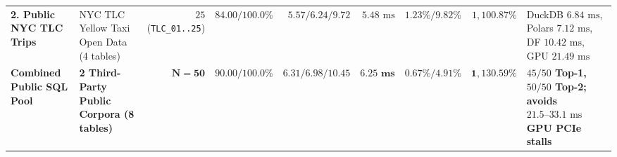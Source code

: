 \documentclass[10pt,a4paper]{article}
\begin{document}
\begin{table}[htbp]
\begin{tabular}{@{}llrrrrrrl@{}}
\textbf{2. Public NYC TLC Trips} & NYC TLC Yellow Taxi Open Data (4 tables) & $25$ (\texttt{TLC\_01..25}) & $\mathbf{84.00 / 100.0\%}$ & $\mathbf{5.57 / 6.24 / 9.72}$ & $5.48\text{ ms}$ & $\mathbf{1.23\% / 9.82\%}$ & $1{,}100.87\%$ & DuckDB $6.84\text{ ms}$, Polars $7.12\text{ ms}$, DF $10.42\text{ ms}$, GPU $21.49\text{ ms}$ \\
\textbf{Combined Public SQL Pool} & \textbf{2 Third-Party Public Corpora (8 tables)} & $\mathbf{N=50}$ & $\mathbf{90.00 / 100.0\%}$ & $\mathbf{6.31 / 6.98 / 10.45}$ & $\mathbf{6.25\text{ ms}}$ & $\mathbf{0.67\% / 4.91\%}$ & $\mathbf{1{,}130.59\%}$ & \textbf{$45/50$ Top-1, $50/50$ Top-2; avoids $21.5\text{--}33.1\text{ ms}$ GPU PCIe stalls} \\
\bottomrule
\end{tabular}
\end{table}
\end{document}
